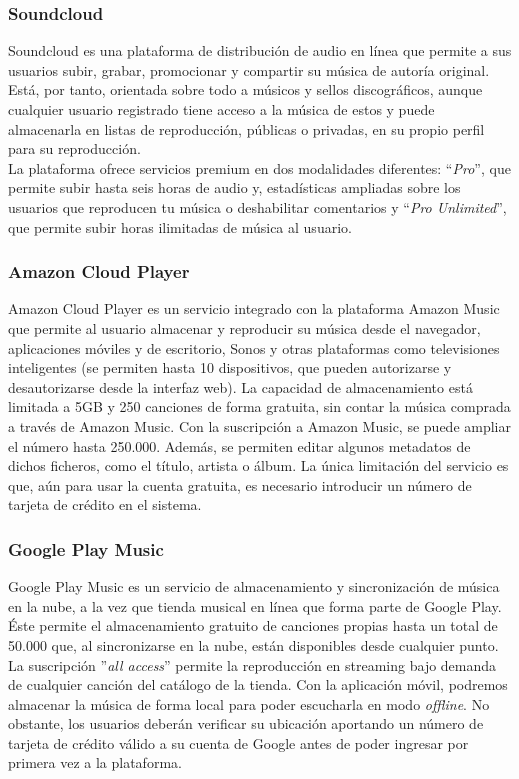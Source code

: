 \subsubsection{Soundcloud \cite{Soundcloud}}
Soundcloud es una plataforma de distribución de audio en línea que permite a sus usuarios subir, grabar, promocionar y compartir su música de autoría original. Está, por tanto, orientada sobre todo a músicos y sellos discográficos, aunque cualquier usuario registrado tiene acceso a la música de estos y puede almacenarla en listas de reproducción, públicas o privadas, en su propio perfil para su reproducción.\\

La plataforma ofrece servicios premium en dos modalidades diferentes: ``\textit{Pro}'', que permite subir hasta seis horas de audio y, estadísticas ampliadas sobre los usuarios que reproducen tu música o deshabilitar comentarios y ``\textit{Pro Unlimited}'', que permite subir horas ilimitadas de música al usuario.

\subsubsection{Amazon Cloud Player \cite{ACP}} 
Amazon Cloud Player es un servicio integrado con la plataforma Amazon Music que permite al usuario almacenar y reproducir su música desde el navegador, aplicaciones móviles y de escritorio, Sonos y otras plataformas como televisiones inteligentes (se permiten hasta 10 dispositivos, que pueden autorizarse y desautorizarse desde la interfaz web). La capacidad de almacenamiento está limitada a 5GB y 250 canciones de forma gratuita, sin contar la música comprada a través de Amazon Music. Con la suscripción a Amazon Music, se puede ampliar el número hasta 250.000. Además, se permiten editar algunos metadatos de dichos ficheros, como el título, artista o álbum. La única limitación del servicio es que, aún para usar la cuenta gratuita, es necesario introducir un número de tarjeta de crédito en el sistema.

\subsubsection{Google Play Music \cite{GPM}}
Google Play Music es un servicio de almacenamiento y sincronización de música en la nube, a la vez que tienda musical en línea que forma parte de Google Play. Éste permite el almacenamiento gratuito de canciones propias hasta un total de 50.000 que, al sincronizarse en la nube, están disponibles desde cualquier punto. La suscripción ''\textit{all access}'' permite la reproducción en streaming bajo demanda de cualquier canción del catálogo de la tienda. Con la aplicación móvil, podremos almacenar la música de forma local para poder escucharla en modo \textit{offline}. No obstante, los usuarios deberán verificar su ubicación aportando un número de tarjeta de crédito válido a su cuenta de Google antes de poder ingresar por primera vez a la plataforma.\\

